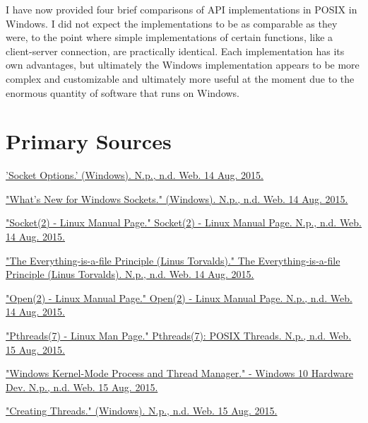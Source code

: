 \documentclass[letterpaper,10pt,titlepage]{article}
\begin{document}
	I have now provided four brief comparisons of API implementations in POSIX in Windows. I did not expect
the implementations to be as comparable as they were, to the point where simple implementations of certain functions,
like a client-server connection, are practically identical. Each implementation has its own advantages, but ultimately 
the Windows implementation appears to be more complex and customizable and ultimately more useful at the moment due to
the enormous quantity of software that runs on Windows.



	
\section{Primary Sources}

\href{https://msdn.microsoft.com/en-us/library/ms740525(v=vs.85).aspx }{'Socket Options.' (Windows). N.p., n.d. Web. 14 Aug. 2015.}

\href{https://msdn.microsoft.com/en-us/library/windows/desktop/ms740642(v=VS.85).aspx }{"What's New for Windows Sockets." (Windows). N.p., n.d. Web. 14 Aug. 2015.}

\href{http://man7.org/linux/man-pages/man2/socket.2.html }{"Socket(2) - Linux Manual Page." Socket(2) - Linux Manual Page. N.p., n.d. Web. 14 Aug. 2015.}

\href{http://yarchive.net/comp/linux/everything_is_file.html }{"The Everything-is-a-file Principle (Linus Torvalds)." The Everything-is-a-file Principle (Linus Torvalds). N.p., n.d. Web. 14 Aug. 2015.}

\href{http://man7.org/linux/man-pages/man2/open.2.html }{"Open(2) - Linux Manual Page." Open(2) - Linux Manual Page. N.p., n.d. Web. 14 Aug. 2015.}

\href{http://linux.die.net/man/7/pthreads }{"Pthreads(7) - Linux Man Page." Pthreads(7): POSIX Threads. N.p., n.d. Web. 15 Aug. 2015.}

\href{https://msdn.microsoft.com/en-us/library/windows/hardware/ff565772(v=vs.85).aspx}{"Windows Kernel-Mode Process and Thread Manager." - Windows 10 Hardware Dev. N.p., n.d. Web. 15 Aug. 2015.}

\href{https://msdn.microsoft.com/en-us/library/windows/desktop/ms682516(v=vs.85).aspx }{"Creating Threads." (Windows). N.p., n.d. Web. 15 Aug. 2015.}
\end{document}
